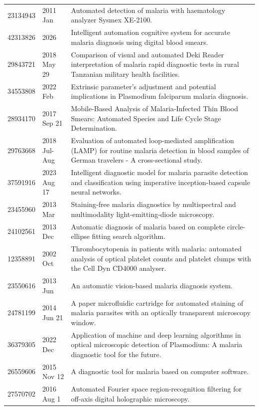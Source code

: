 \begin{longtable}{llp{9.5cm}}
23134943 & 2011 Jan & Automated detection of malaria with haematology analyzer Sysmex XE-2100. \\
42313826 & 2026 & Intelligent automation cognitive system for accurate malaria diagnosis using digital blood smears. \\
29843721 & 2018 May 29 & Comparison of visual and automated Deki Reader interpretation of malaria rapid diagnostic tests in rural Tanzanian military health facilities. \\
34553808 & 2022 Feb & Extrinsic parameter's adjustment and potential implications in Plasmodium falciparum malaria diagnosis. \\
28934170 & 2017 Sep 21 & Mobile-Based Analysis of Malaria-Infected Thin Blood Smears: Automated Species and Life Cycle Stage Determination. \\
29763668 & 2018 Jul-Aug & Evaluation of automated loop-mediated amplification (LAMP) for routine malaria detection in blood samples of German travelers - A cross-sectional study. \\
37591916 & 2023 Aug 17 & Intelligent diagnostic model for malaria parasite detection and classification using imperative inception-based capsule neural networks. \\
23455960 & 2013 Mar & Staining-free malaria diagnostics by multispectral and multimodality light-emitting-diode microscopy. \\
24102561 & 2013 Dec & Automatic diagnosis of malaria based on complete circle-ellipse fitting search algorithm. \\
12358891 & 2002 Oct & Thrombocytopenia in patients with malaria: automated analysis of optical platelet counts and platelet clumps with the Cell Dyn CD4000 analyser. \\
23550616 & 2013 Jun & An automatic vision-based malaria diagnosis system. \\
24781199 & 2014 Jun 21 & A paper microfluidic cartridge for automated staining of malaria parasites with an optically transparent microscopy window. \\
36379305 & 2022 Dec & Application of machine and deep learning algorithms in optical microscopic detection of Plasmodium: A malaria diagnostic tool for the future. \\
26559606 & 2015 Nov 12 & A diagnostic tool for malaria based on computer software. \\
27570702 & 2016 Aug 1 & Automated Fourier space region-recognition filtering for off-axis digital holographic microscopy. \\

\end{longtable}
